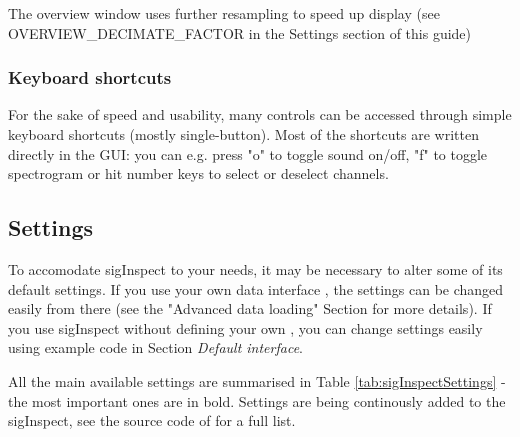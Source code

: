 \documentclass[a4paper,10pt]{article}
\begin{document}
The overview window uses further resampling to speed up display (see OVERVIEW\_DECIMATE\_FACTOR in the Settings section of this guide)

\subsubsection{Keyboard shortcuts}
For the sake of speed and usability, many controls can be accessed through simple keyboard shortcuts (mostly single-button). Most of the shortcuts are written directly in the GUI: you can e.g. press "o" to toggle sound on/off, "f" to toggle spectrogram or hit number keys to select or deselect channels.

\subsection{Settings}
To accomodate sigInspect to your needs, it may be necessary to alter some of its default settings. If you use your own data interface , the settings can be changed easily from there (see the "Advanced data loading" Section for more details). If you use sigInspect without defining your own , you can change settings easily using example code in Section \emph{Default interface}. 

All the main available settings are summarised in Table \ref{tab:sigInspectSettings} - the most important ones are in bold. Settings are being continously added to the sigInspect, see the source code of  for a full list.

\end{document}
